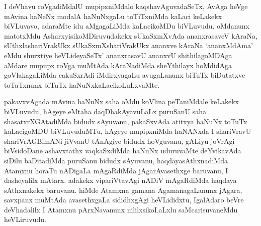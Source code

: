 
\begin{artha}
I deVhavu roVgadiMdalU mupipxniMdalo kaqshavAguvadaSeTx, AvAga heVge mAvina haNeNx modalA haNuNxgaLu toTiTxniMda kaLaci keLakekx biVLuvavo, adaraMte idu aMgagaLiMda kaLacikoMDu biVLuvudu. oMdanunx matotxMdu AsharxyisikoMDiruvudakekx sUkaSxmXvAda ananxrasaveV kAraNa, sUthxlashariVrakUkx sUkaSxmXshariVrakUkx ananxve kAraNa `ananxMdAma' eMdu shurxtiye heVLideyaSeTx' ananxrasavU ananxvU shithilagoMDAga aMdare mupupx roVga muMtAda kAraNadiMda sheYthilayx hoMdidAga goVlakagaLiMda cakuSxrAdi iMdirxyagaLu avugaLanunx biTuTx biDutatxve toTaTxnunx biTuTx haNuNxkaLacikoLuLxvaMte. 
\end{artha}%

\begin{artha}
pakavxvAgada mAvina haNuNx saha oMdu koVlina peTaniMdale keLakekx biVLuvudu, hAgeye eMtaha daqDhakAyavuLaLx puruSanU saha shasatxrXGAtadiMda bidudx sAyuvanu, pakaSxvAda atitxya haNuNx toTuTx kaLacigoMDU biVLuvuduMTu, hAgeye mupipxniMda haNANxda I shariVravU shariVrAGBimANi jiVvanU tAnAgiye bidudx hoVguvanu, gALiyu joVrAgi biVsidoDane ashavxtathx vaqkaSxdiMda haNuNx uduruvaMte deYvikavAda siDilu baDitadiMda puruSanu bidudx sAyuvanu, haqdayasAthxnadiMda Atamxnu horaTu nADigaLa mAgaRdiMda jAgarAvasethxge baruvanu, I dasheyalilx mAtarx. adakekx vipariVtavAgi nADiV mAgaRdiMda haqdaya sAthxnakekx baruvanu. hiMde Atamxna gamana AgamanagaLanunx jAgara, savxpanx muMtAda avasethxgaLa sididhxgAgi heVLididxtu, IgalAdaro beVre deVhadalilx I Atamxnu pArxNavanunx nililxsikoLaLxlu saMcarisuvaneMdu heVLiruvudu.
\end{artha}


